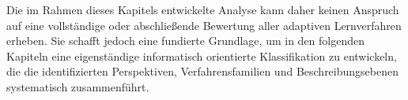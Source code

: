 Die im Rahmen dieses Kapitels entwickelte Analyse kann daher keinen
Anspruch auf eine vollständige oder abschließende Bewertung aller
adaptiven Lernverfahren erheben. Sie schafft jedoch eine fundierte
Grundlage, um in den folgenden Kapiteln eine eigenständige informatisch
orientierte Klassifikation zu entwickeln, die die identifizierten
Perspektiven, Verfahrensfamilien und Beschreibungsebenen systematisch
zusammenführt.

